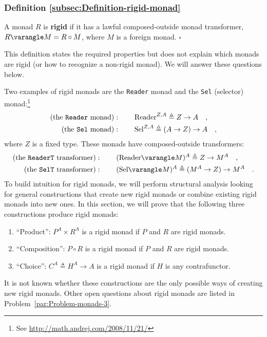 \subsubsection{Definition \label{subsec:Definition-rigid-monad}\ref{subsec:Definition-rigid-monad}}

A monad $R$ is \textbf{rigid} if it has a lawful composed-outside
monad transformer, $R\varangle M=R\circ M$, where $M$ is a foreign
monad. $\square$

This definition states the required properties but does not explain
which monads are rigid (or how to recognize a non-rigid monad). We
will answer these questions below.

Two examples of rigid monads are the \lstinline!Reader! monad and
the \lstinline!Sel! (selector)
monad:\footnote{See \href{http://math.andrej.com/2008/11/21/}{http://math.andrej.com/2008/11/21/}}
\begin{align*}
\text{(the \texttt{Reader} monad)} & :\quad\quad\text{Reader}^{Z,A}\triangleq Z\rightarrow A\quad,\\
\text{(the \texttt{Sel} monad)} & :\quad\quad\text{Sel}^{Z,A}\triangleq\left(A\rightarrow Z\right)\rightarrow A\quad,
\end{align*}
where $Z$ is a fixed type. These monads have composed-outside transformers:
\begin{align*}
\text{(the \texttt{ReaderT} transformer)} & :\quad\quad(\text{Reader}\varangle M)^{A}\triangleq Z\rightarrow M^{A}\quad,\\
\text{(the \texttt{SelT} transformer)} & :\quad\quad(\text{Sel}\varangle M)^{A}\triangleq(M^{A}\rightarrow Z)\rightarrow M^{A}\quad.
\end{align*}
To build intuition for rigid monads, we will perform structural analysis
looking for general constructions that create new rigid monads or
combine existing rigid monads into new ones. In this section, we will
prove that the following three constructions produce rigid monads:
\begin{enumerate}
\item \textsf{``}Product\textsf{''}: $P^{A}\times R^{A}$ is a rigid monad if $P$ and $R$
are rigid monads.
\item \textsf{``}Composition\textsf{''}: $P\circ R$ is a rigid monad if $P$ and $R$ are
rigid monads.
\item \textsf{``}Choice\textsf{''}: $C^{A}\triangleq H^{A}\rightarrow A$ is a rigid monad
if $H$ is any contrafunctor.
\end{enumerate}
It is not known whether these constructions are the only possible
ways of creating new rigid monads. Other open questions about rigid
monads are listed in Problem~\ref{par:Problem-monads-3}.

